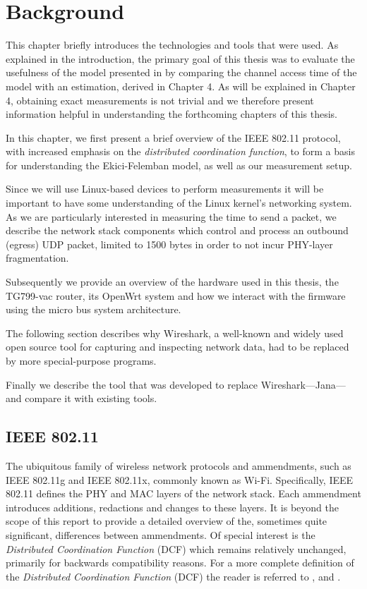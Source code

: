 
\chapter{Background}

This chapter briefly introduces the technologies and tools that were used. As
explained in the introduction, the primary goal of this thesis was to evaluate
the usefulness of the model presented in \cite{felemban} by comparing the
channel access time of the model with an estimation, derived in Chapter 4. As
will be explained in Chapter 4, obtaining exact measurements is not trivial
and we therefore present information helpful in understanding the forthcoming
chapters of this thesis. 

In this chapter, we first present a brief overview of the IEEE 802.11
protocol, with increased emphasis on the \emph{distributed coordination
function}, to form a basis for understanding the Ekici-Felemban model, as well
as our measurement setup.

Since we will use Linux-based devices to perform measurements it will be
important to have some understanding of the Linux kernel's networking system.
As we are particularly interested in measuring the time to send a packet, we
describe the network stack components which control and process an outbound
(egress) UDP packet, limited to 1500 bytes in order to not incur PHY-layer
fragmentation.

Subsequently we provide an overview of the hardware used in this thesis, the
TG799-vac router, its OpenWrt system and how we interact with the firmware
using the micro bus system architecture. 

The following section describes why Wireshark, a well-known and widely used
open source tool for capturing and inspecting network data, had to be replaced
by more special-purpose programs.

Finally we describe the tool that was developed to replace Wireshark—Jana—and
compare it with existing tools.

\section{IEEE 802.11}

The ubiquitous family of wireless network protocols and ammendments, such as
IEEE 802.11g and IEEE 802.11x, commonly known as Wi-Fi. Specifically, IEEE
802.11 defines the PHY and MAC layers of the network stack. Each ammendment
introduces additions, redactions and changes to these layers. It is beyond the
scope of this report to provide a detailed overview of the, sometimes quite
significant, differences between ammendments. Of special interest is the
\emph{Distributed Coordination Function} (DCF) which remains relatively
unchanged, primarily for backwards compatibility reasons. For a more complete
definition of the \emph{Distributed Coordination Function} (DCF) the reader is
referred to \cite{654749}, \cite{5307322} and \cite{6687187}. 

